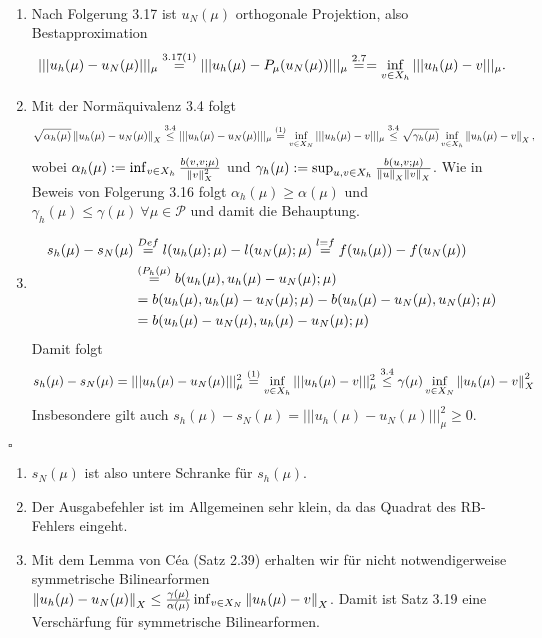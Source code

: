 \\
\begin{enumerate}[(1)]
	\item Nach Folgerung 3.17 ist $u_N(\mu)$ orthogonale Projektion, also Bestapproximation
	\[
	|||u_h(\mu)-u_N(\mu)|||_\mu \stackrel{3.17(1)}{=} |||u_h(\mu)-P_\mu(u_N(\mu))|||_\mu \stackrel{2.7}{=} = \inf\limits_{v\in X_h} |||u_h(\mu)-v|||_\mu.
	\]
	\item Mit der Normäquivalenz 3.4 folgt 
	\[
	\sqrt{\alpha_h(\mu)}\left\Vert u_h(\mu)-u_N(\mu)\right\Vert_X \stackrel{3.4}{\le} |||u_h(\mu)-u_N(\mu)|||_\mu \stackrel{(1)}{=} \inf\limits_{v\in X_N} |||u_h(\mu)-v|||_\mu \stackrel{3.4}{\le} \sqrt{\gamma_h(\mu)} \inf\limits_{v\in X_h} \left\Vert u_h(\mu)-v\right\Vert_X,
	\]
	wobei $\alpha_h(\mu) := \inf_{v\in X_h} \frac{b(v,v;\mu)}{\left\Vert v\right\Vert_X^2}$ und $\gamma_h(\mu):= \sup_{u,v\in X_h} \frac{b(u,v;\mu)}{\left\Vert u\right\Vert_X\left\Vert v\right\Vert_X}$.
	Wie in Beweis von Folgerung 3.16 folgt $\alpha_h(\mu)\ge \alpha(\mu)$ und $\gamma_h(\mu)\le \gamma(\mu)~\forall \mu\in \mathcal{P}$ und damit die Behauptung.
	\item
	\begin{align*}
	s_h(\mu)-s_N(\mu) &\stackrel{Def}{=} l(u_h(\mu);\mu)-l(u_N(\mu);\mu) \stackrel{l=f}{=} f(u_h(\mu))-f(u_N(\mu))\\
	&\stackrel{(P_h(\mu)}{=} b(u_h(\mu),u_h(\mu)-u_N(\mu);\mu)\\
	&= b(u_h(\mu),u_h(\mu)-u_N(\mu);\mu)- b(u_h(\mu)-u_N(\mu),u_N(\mu);\mu)\\
	&= b(u_h(\mu)-u_N(\mu),u_h(\mu)-u_N(\mu);\mu)
	\end{align*}
	Damit folgt
	\[
	s_h(\mu)-s_N(\mu) = |||u_h(\mu)-u_N(\mu)|||_\mu^2 \stackrel{(1)}{=} \inf\limits_{v\in X_h} |||u_h(\mu)-v|||_\mu^2 \stackrel{3.4}{\le} \gamma(\mu)\inf\limits_{v\in X_N} \left\Vert u_h(\mu)-v\right\Vert_X^2
	\]
	Insbesondere gilt auch $s_h(\mu)-s_N(\mu) = |||u_h(\mu)-u_N(\mu)|||_\mu^2 \ge 0$.
\end{enumerate}
\hfill $\square$

\begin{enumerate}[(1)]
	\item $s_N(\mu)$ ist also untere Schranke für $s_h(\mu)$.
	\item Der Ausgabefehler ist im Allgemeinen sehr klein, da das Quadrat des RB-Fehlers eingeht.
	\item Mit dem Lemma von Céa (Satz 2.39) erhalten wir für nicht notwendigerweise symmetrische Bilinearformen $\left\Vert u_h(\mu)-u_N(\mu)\right\Vert_X \le \frac{\gamma(\mu)}{\alpha(\mu)} \inf_{v\in X_N} \left\Vert u_h(\mu)-v\right\Vert_X$.
	Damit ist Satz 3.19 eine Verschärfung für symmetrische Bilinearformen.
\end{enumerate}

